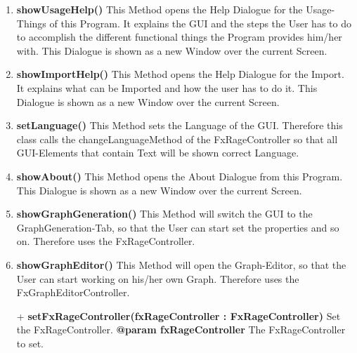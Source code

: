 \documentclass{article}
\begin{document}
\begin{enumerate}[-]
{						This Dialogue is shown as a new Window over the current Screen.
						\newline
					}
					\item{
						\textbf{showUsageHelp()} \newline
						This Method opens the Help Dialogue for the Usage-Things of this Program.
						It explains the GUI and the steps the User has to do to accomplish the different functional things the Program provides him/her with.
						This Dialogue is shown as a new Window over the current Screen.
						\newline
					}
					\item{
						\textbf{showImportHelp()} \newline
						This Method opens the Help Dialogue for the Import.
						It explains what can be Imported and how the user has to do it.
						This Dialogue is shown as a new Window over the current Screen.
						\newline
					}
					\item{
						\textbf{setLanguage()} \newline
						This Method sets the Language of the GUI.
						Therefore this class calls the changeLanguageMethod of the FxRageController so that all GUI-Elements that contain Text will be shown correct Language.
						\newline
					}
					\item{
						\textbf{showAbout()} \newline
						This Method opens the About Dialogue from this Program.
						This Dialogue is shown as a new Window over the current Screen.
						\newline
					}
					\item{
						\textbf{showGraphGeneration()} \newline
						This Method will switch the GUI to the GraphGeneration-Tab, so that the User can start set the properties and so on.
						Therefore uses the FxRageController.
						\newline
					}
					\item{
						\textbf{showGraphEditor()} \newline
						This Method will open the Graph-Editor, so that the User can start working on his/her own Graph.
						Therefore uses the FxGraphEditorController.
						\newline
					}
					\item[+]{
						\textbf{setFxRageController(fxRageController : FxRageController)} \newline
						Set the FxRageController.
						\textbf{@param fxRageController}
							The FxRageController to set.
							\newline
					}
				\end{enumerate}
	
\end{document}
